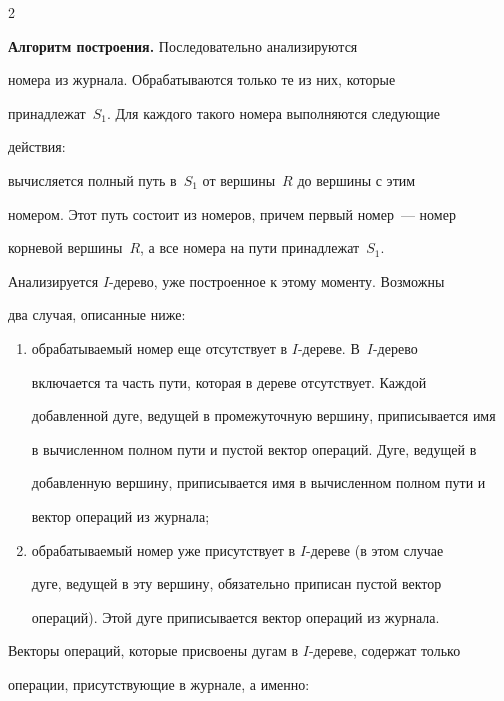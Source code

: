 \begin{multicols}{2}
      \smallskip


      


      \noindent


      \textbf{Алгоритм построения.} Последовательно анализируются 


номера из журнала. Обрабатываются только те из них, которые 


принадлежат~$S_1$. Для каждого такого номера выполняются следующие 


действия:


вычисляется полный путь в~$S_1$ от вершины~$R$ до вершины с этим 


номером. Этот путь состоит из номеров, причем первый номер~--- номер 


корневой вершины~$R$, а все номера на пути принадлежат~$S_1$. 


Анализируется $I$-дерево, уже построенное к этому моменту. Возможны 


два случая, описанные ниже:


\begin{enumerate}[(1)]


\item обрабатываемый номер еще отсутствует в $I$-де\-ре\-ве. В~$I$-дерево 


включается та часть пути, которая в дереве отсутствует. Каждой 


до\-бав\-лен\-ной дуге, ведущей в промежуточную вершину, приписывается имя 


в вычисленном полном пути и пустой вектор операций. Дуге, ведущей в 


добавленную вершину, приписывается имя в вычисленном полном пути и 


вектор операций из журнала;\\[-15pt]


\item обрабатываемый номер уже присутствует в $I$-де\-ре\-ве (в этом случае 


дуге, ведущей в эту вершину, обязательно приписан пустой вектор 


операций). Этой дуге приписывается вектор операций из журнала.


\end{enumerate}





Векторы операций, которые присвоены дугам в $I$-дереве, содержат только 


операции, при\-сут\-ст\-ву\-ющие в журнале, а именно:



\end{multicols}
